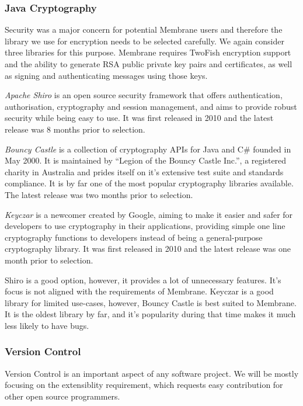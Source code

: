\documentclass[11pt, a4paper, twocolumn, twoside]{report}
\begin{document}
\subsubsection{Java Cryptography}

Security was a major concern for potential Membrane users and therefore the library we use for encryption needs to be selected carefully. We again consider three libraries for this purpose. Membrane requires TwoFish encryption support and the ability to generate RSA public private key pairs and certificates, as well as signing and authenticating messages using those keys.

\emph{Apache Shiro} is an open source security framework that offers authentication, authorisation, cryptography and session management, and aims to provide robust security while being easy to use. It was first released in 2010 and the latest release was 8 months prior to selection. \citep{apache2017shiro}

\emph{Bouncy Castle} is a collection of cryptography APIs for Java and C\# founded in May 2000. It is maintained by ``Legion of the Bouncy Castle Inc.'', a registered charity in Australia and prides itself on it's extensive test suite and standards compliance. It is by far one of the most popular cryptography libraries available. \citep{bouncy2017castle} The latest release was two months prior to selection.

\emph{Keyczar} is a newcomer created by Google, aiming to make it easier and safer for developers to use cryptography in their applications, providing simple one line cryptography functions to developers instead of being a general-purpose cryptography library. It was first released in 2010 and the latest release was one month prior to selection. \citep{keyczar2017github}

Shiro is a good option, however, it provides a lot of unnecessary features. It's focus is not aligned with the requirements of Membrane. Keyczar is a good library for limited use-cases, however, Bouncy Castle is best suited to Membrane. It is the oldest library by far, and it's popularity during that time makes it much less likely to have bugs.

\subsubsection{Version Control}

Version Control is an important aspect of any software project. We will be mostly focusing on the extensiblity requirement, which requests easy contribution for other open source programmers.
\end{document}
